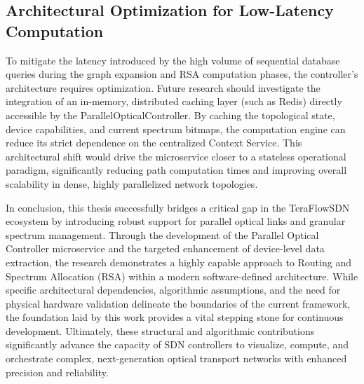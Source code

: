 \subsection*{\small Architectural Optimization for Low-Latency Computation}
To mitigate the latency introduced by the high volume of sequential database queries during the graph expansion and RSA computation phases, the controller's architecture requires optimization. Future research should investigate the integration of an in-memory, distributed caching layer (such as Redis) directly accessible by the ParallelOpticalController. By caching the topological state, device capabilities, and current spectrum bitmaps, the computation engine can reduce its strict dependence on the centralized Context Service. This architectural shift would drive the microservice closer to a stateless operational paradigm, significantly reducing path computation times and improving overall scalability in dense, highly parallelized network topologies.

In conclusion, this thesis successfully bridges a critical gap in the TeraFlowSDN ecosystem by introducing robust support for parallel optical links and granular spectrum management. Through the development of the Parallel Optical Controller microservice and the targeted enhancement of device-level data extraction, the research demonstrates a highly capable approach to Routing and Spectrum Allocation (RSA) within a modern software-defined architecture. While specific architectural dependencies, algorithmic assumptions, and the need for physical hardware validation delineate the boundaries of the current framework, the foundation laid by this work provides a vital stepping stone for continuous development. Ultimately, these structural and algorithmic contributions significantly advance the capacity of SDN controllers to visualize, compute, and orchestrate complex, next-generation optical transport networks with enhanced precision and reliability.